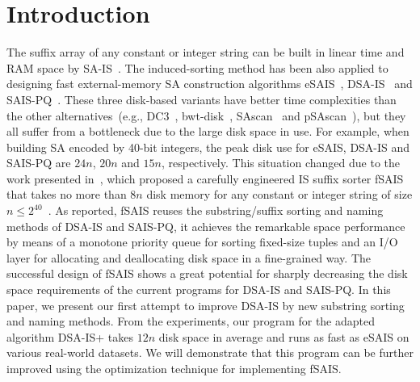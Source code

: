 \documentclass[10pt,journal,compsoc]{IEEEtran}
\begin{document}
\maketitle

\IEEEdisplaynontitleabstractindextext

\IEEEpeerreviewmaketitle

\section{Introduction}\label{sec:introduction}

The suffix array of any constant or integer string can be built in linear time and RAM space by SA-IS~\cite{Nong11}. The induced-sorting method has been also applied to designing fast external-memory SA construction algorithms eSAIS~\cite{Bingmann12}, DSA-IS~\cite{Nong15} and SAIS-PQ~\cite{Liu15}. These three disk-based variants have better time complexities than the other alternatives~(e.g., DC3~\cite{Dementiev2008a}, bwt-disk~\cite{Ferragina2012}, SAscan~\cite{Karkkainen2014} and pSAscan~\cite{Karkkainen2015}), but they all suffer from a bottleneck due to the large disk space in use. For example, when building SA encoded by 40-bit integers, the peak disk use for eSAIS, DSA-IS and SAIS-PQ are $24n$, $20n$ and $15n$, respectively. This situation changed due to the work presented in~\cite{Karkkainen2017}, which proposed a carefully engineered IS suffix sorter fSAIS that takes no more than $8n$ disk memory for any constant or integer string of size $n \le 2^{40}$~\cite{Karkkainen2017}. As reported, fSAIS reuses the substring/suffix sorting and naming methods of DSA-IS and SAIS-PQ, it achieves the remarkable space performance by means of a monotone priority queue for sorting fixed-size tuples and an I/O layer for allocating and deallocating disk space in a fine-grained way. The successful design of fSAIS shows a great potential for sharply decreasing the disk space requirements of the current programs for DSA-IS and SAIS-PQ. In this paper, we present our first attempt to improve DSA-IS by new substring sorting and naming methods. From the experiments, our program for the adapted algorithm DSA-IS+ takes $12n$ disk space in average and runs as fast as eSAIS on various real-world datasets. We will demonstrate that this program can be further improved using the optimization technique for implementing fSAIS.
\end{document}
